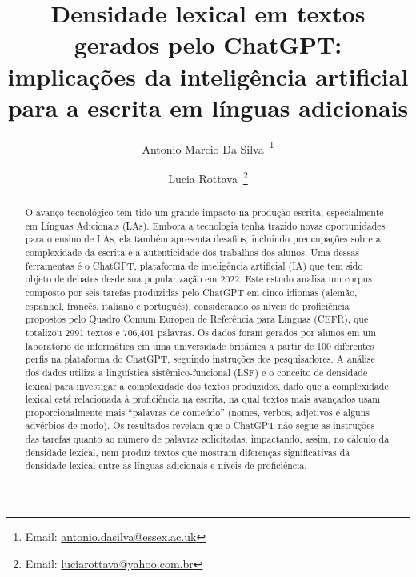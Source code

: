 \documentclass[portuguese]{textolivre}
\title{Densidade lexical em textos gerados pelo ChatGPT: implicações da inteligência artificial para a escrita em línguas adicionais}
\author[1]{Antonio Marcio Da Silva~\orcid{0000-0002-4628-4091}\thanks{Email: \href{mailto:antonio.dasilva@essex.ac.uk}{antonio.dasilva@essex.ac.uk}}}
\author[2]{Lucia Rottava~\orcid{0000-0003-3094-6270}\thanks{Email: \href{mailto:luciarottava@yahoo.com.br}{luciarottava@yahoo.com.br}}}
\affil[1]{University of Essex, Colchester, Inglaterra.}
\affil[2]{Universidade Federal do Rio Grande do Sul, Instituto de Letras, Porto Alegre, RS, Brasil.}
\begin{document}
\maketitle

\begin{polyabstract}
\begin{abstract}
O avanço tecnológico tem tido um grande impacto na produção escrita, especialmente em Línguas Adicionais (LAs). Embora a tecnologia tenha trazido novas oportunidades para o ensino de LAs, ela também apresenta desafios, incluindo preocupações sobre a complexidade da escrita e a autenticidade dos trabalhos dos alunos. Uma dessas ferramentas é o ChatGPT, plataforma de inteligência artificial (IA) que tem sido objeto de debates desde sua popularização em 2022. Este estudo analisa um corpus composto por seis tarefas produzidas pelo ChatGPT em cinco idiomas (alemão, espanhol, francês, italiano e português), considerando os níveis de proficiência propostos pelo Quadro Comum Europeu de Referência para Línguas (CEFR), que totalizou 2991 textos e 706,401 palavras. Os dados foram gerados por alunos em um laboratório de informática em uma universidade britânica a partir de 100 diferentes perfis na plataforma do ChatGPT, seguindo instruções dos pesquisadores. A análise dos dados utiliza a linguística sistêmico-funcional (LSF) e o conceito de densidade lexical \cite{halliday_spoken_1985,halliday_spoken_1987,halliday_grammatical_1993,halliday_introduction_2014} para investigar a complexidade dos textos produzidos, dado que a complexidade lexical está relacionada à proficiência na escrita, na qual textos mais avançados usam proporcionalmente mais “palavras de conteúdo” (nomes, verbos, adjetivos e alguns advérbios de modo). Os resultados revelam que o ChatGPT não segue as instruções das tarefas quanto ao número de palavras solicitadas, impactando, assim, no cálculo da densidade lexical, nem produz textos que mostram diferenças significativas da densidade lexical entre as línguas adicionais e níveis de proficiência.

\end{abstract}


\end{polyabstract}
\end{document}
